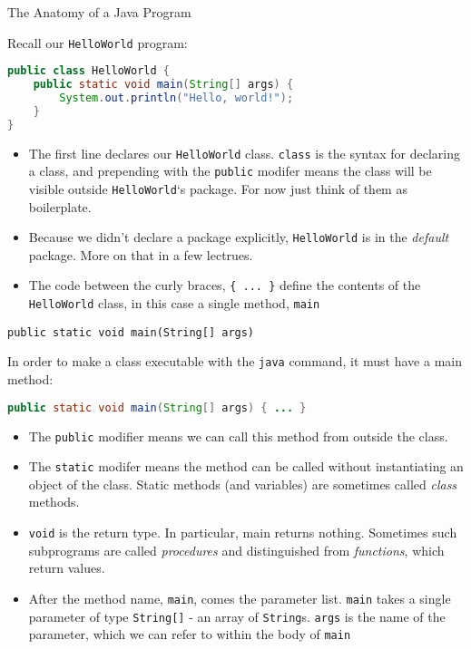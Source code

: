 \documentclass{beamer}
\begin{document}
\begin{frame}[fragile]{The Anatomy of a Java Program}


Recall our {\tt HelloWorld} program:
\begin{lstlisting}[language=Java]
public class HelloWorld {
    public static void main(String[] args) {
        System.out.println("Hello, world!");
    }
}
\end{lstlisting}
\vspace{-.1in}
\begin{itemize}
\item The first line declares our {\tt HelloWorld} class.  {\tt class} is the syntax for declaring a class, and prepending with the {\tt public} modifer means the class will be visible outside {\tt HelloWorld}`s package.  For now just think of them as boilerplate.
\item Because we didn't declare a package explicitly, {\tt HelloWorld} is in the {\it default} package.  More on that in a few lectrues.
\item The code between the curly braces, {\tt \{ ... \}} define the contents of the {\tt HelloWorld} class, in this case a single method, {\tt main}
\end{itemize}

\end{frame}

\begin{frame}[fragile]{{\tt public static void main(String[] args)}}


In order to make a class executable with the {\tt java} command, it must have a main method:
\begin{lstlisting}[language=Java]
public static void main(String[] args) { ... }
\end{lstlisting}
\vspace{-.1in}
\begin{itemize}
\item The {\tt public} modifier means we can call this method from outside the class.
\item The {\tt static} modifer means the method can be called without instantiating an object of the class.  Static methods (and variables) are sometimes called {\it class} methods.
\item {\tt void} is the return type.  In particular, main returns nothing.  Sometimes such subprograms are called {\it procedures} and distinguished from {\it functions}, which return values.
\item After the method name, {\tt main}, comes the parameter list.  {\tt main} takes a single parameter of type {\tt String[]} - an array of {\tt String}s.  {\tt args} is the name of the parameter, which we can refer to within the body of {\tt main}
\end{itemize}

\end{frame}
\end{document}
